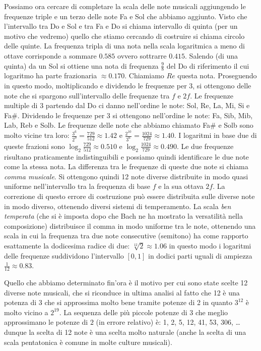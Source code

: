 Possiamo ora cercare di completare la scala delle note musicali aggiungendo le frequenze triple 
e un terzo delle note Fa e Sol che abbiamo aggiunto. 
Visto che l'intervallo tra Do e Sol e tra Fa e Do si chiama intervallo di quinta (per un motivo che vedremo)
quello che stiamo cercando di costruire si chiama circolo delle quinte.
La frequenza tripla di una nota nella scala logaritmica a meno di ottave corrisponde a sommare $0.585$
ovvero sottrarre $0.415$. Salendo (di una quinta) da un Sol si ottiene una nota 
di frequenza $\frac 9 8$ del Do di riferimento il cui logaritmo ha parte frazionaria $\approx 0.170$.
Chiamiamo $Re$ questa nota. 
Proseguendo in questo modo, moltiplicando e dividendo le frequenze per $3$, 
si ottengono delle note che si spargono sull'intervallo delle frequenze 
tra $f$ e $2f$. 
Le frequenze multiple di $3$ partendo dal Do ci danno nell'ordine le note: 
Sol, Re, La, Mi, Si e Fa\#. Dividendo le frequenze per 3 si 
ottengono nell'ordine le note: Fa, Sib, Mib, Lab, Reb e Solb.
Le frequenze delle note che abbiamo chiamato Fa\# e Solb sono molto vicine 
tra loro: $\frac{3^6}{2^9} = \frac{729}{512} \approx 1.42$ 
e $\frac{2^10}{3^6} = \frac{1024}{729} \approx 1.40$.
I logaritmi in base due di queste frazioni sono $\log_2 \frac{729}{512} \approx 0.510$ 
e $\log_2 \frac{1024}{729} \approx 0.490$. 
Le due frequenze risultano praticamente indistinguibili
e possiamo quindi identificare le due note come la stessa nota.
La differenza tra le frequenze di queste due note si chiama \emph{comma musicale}.
Si ottengono quindi 12 note diverse distribuite in modo quasi uniforme nell'intervallo 
tra la frequenza di base $f$ e la sua ottava $2f$.
La correzione di questo errore di costruzione può essere distribuita sulle diverse 
note in modo diverso, ottenendo diversi sistemi di temperamento.
La scala \emph{ben temperata} (che si è imposta dopo che Bach ne ha mostrato
la versatilità nella composizione) distribuisce il comma in modo uniforme
tra le note, ottenendo una scala in cui la frequenza tra due note consecutive 
(semitono) ha come rapporto esattamente la dodicesima radice di due: 
$\sqrt[12]{2}\approx 1.06$ in questo modo i logaritmi delle frequenze suddividono 
l'intervallo $[0,1]$ in dodici parti uguali di ampiezza $\frac 1 {12} \approx 0.83$.

Quello che abbiamo determinato fin'ora è il motivo per cui sono state scelte 
12 diverse note musicali, 
che si riconduce in ultima analisi al fatto che 12 è una potenza di 3 che si approssima 
molto bene tramite potenze di 2 in quanto $3^12$ è molto vicino a $2^19$.
La sequenza delle più piccole potenze di $3$ che meglio approssimano le potenze 
di $2$ (in errore relativo) è: 1, 2, 5, 12, 41, 53, 306, \dots
dunque la scelta di 12 note è una scelta molto naturale (anche la scelta di una scala 
pentatonica è comune in molte culture musicali).

